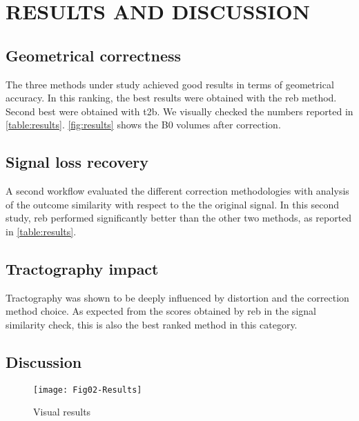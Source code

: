 \section{RESULTS AND DISCUSSION}

\subsection{Geometrical correctness}

The three methods under study achieved good results in
terms of geometrical accuracy. In this ranking, the best
results were obtained with the \gls*{reb} method. Second
best were obtained with \gls*{t2b}. We visually checked
the numbers reported in \autoref{table:results}. 
\autoref{fig:results} shows the B0 volumes after correction.


\subsection{Signal loss recovery}

A second workflow evaluated the different correction methodologies
with analysis of the outcome similarity with respect to the
the original signal. In this second study, \gls*{reb} performed
significantly better than the other two methods, as reported
in \autoref{table:results}.

\subsection{Tractography impact}

Tractography was shown to be deeply influenced by distortion and
the correction method choice. As expected from the scores obtained
by \gls*{reb} in the signal similarity check, this is also the
best ranked method in this category. 

\subsection{Discussion}



\begin{figure}[thpb]
   \centering
   \texttt{[image: Fig02-Results]}
   \caption{Visual results}
   \label{fig:results}
\end{figure}

